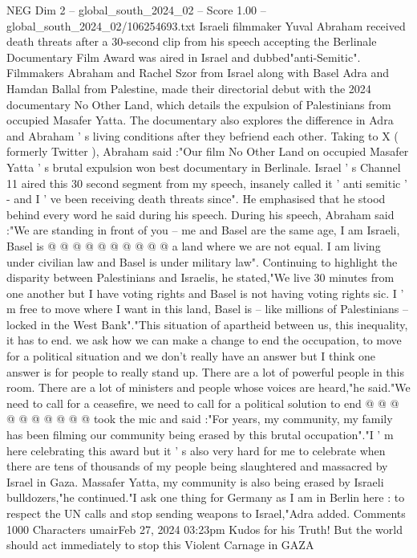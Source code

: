 \begin{textsample}{NEG Dim 2 – global\_south\_2024\_02 – Score 1.00 – global\_south\_2024\_02/106254693.txt}  \label{ex:f2_neg_413}
Israeli filmmaker Yuval Abraham received death threats after a 30-second clip from his speech accepting the Berlinale Documentary Film Award was aired in Israel and dubbed"anti-Semitic".
Filmmakers Abraham and Rachel Szor from Israel along with Basel Adra and Hamdan Ballal from Palestine, made their directorial debut with the 2024 documentary No Other Land, which details the expulsion of Palestinians from occupied Masafer Yatta.
The documentary also explores the difference in Adra and Abraham ' s living conditions after they befriend each other.
Taking to X ( formerly Twitter ), Abraham said :"Our film No Other Land on occupied Masafer Yatta ' s brutal expulsion won best documentary in Berlinale.
Israel ' s Channel 11 aired this 30 second segment from my speech, insanely called it ' anti semitic ' - and I ' ve been receiving death threats since".
He emphasised that he stood behind every word he said during his speech.
During his speech, Abraham said :"We are standing in front of you -- me and Basel are the same age, I am Israeli, Basel is @ @ @ @ @ @ @ @ @ @ a land where we are not equal.
I am living under civilian law and Basel is under military law".
Continuing to highlight the disparity between Palestinians and Israelis, he stated,"We live 30 minutes from one another but I have voting rights and Basel is not having voting rights sic.
I ' m free to move where I want in this land, Basel is -- like millions of Palestinians -- locked in the West Bank"."This situation of apartheid between us, this inequality, it has to end. we ask how we can make a change to end the occupation, to move for a political situation and we don't really have an answer but I think one answer is for people to really stand up.
There are a lot of powerful people in this room.
There are a lot of ministers and people whose voices are heard,"he said."We need to call for a ceasefire, we need to call for a political solution to end @ @ @ @ @ @ @ @ @ @ took the mic and said :"For years, my community, my family has been filming our community being erased by this brutal occupation"."I ' m here celebrating this award but it ' s also very hard for me to celebrate when there are tens of thousands of my people being slaughtered and massacred by Israel in Gaza.
Massafer Yatta, my community is also being erased by Israeli bulldozers,"he continued."I ask one thing for Germany as I am in Berlin here : to respect the UN calls and stop sending weapons to Israel,"Adra added.
Comments 1000 Characters umairFeb 27, 2024 03:23pm Kudos for his Truth!
But the world should act immediately to stop this Violent Carnage in GAZA

\end{textsample}
